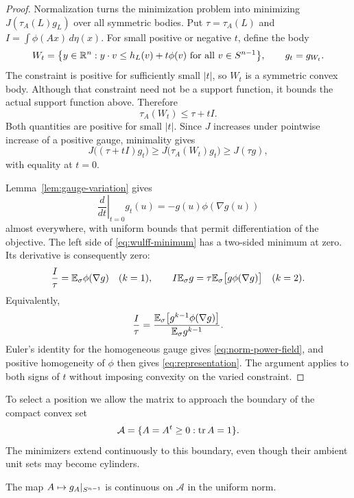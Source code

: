 \begin{proof}
Normalization turns the minimization problem into minimizing
$J(\tau_A(L)g_L)$ over all symmetric bodies. Put
$\tau=\tau_A(L)$ and $I=\int\phi(Ax)\,d\eta(x)$. For small
positive or negative $t$, define the body
\[
 W_t=\bigl\{y\in\mathbb R^n:
       y\cdot v\le h_L(v)+t\phi(v)\text{ for all }v\in S^{n-1}\bigr\},
 \qquad g_t=g_{W_t}.
\]
The constraint is positive for sufficiently small $|t|$, so $W_t$ is
a symmetric convex body. Although that constraint need not be a
support function, it bounds the actual support function above.
Therefore
\[
 \tau_A(W_t)\le\tau+tI.
\]
Both quantities are positive for small $|t|$. Since $J$ increases
under pointwise increase of a positive gauge, minimality gives
\begin{equation}\label{eq:wulff-minimum}
 J\bigl((\tau+tI)g_t\bigr)
 \ge J\bigl(\tau_A(W_t)g_t\bigr)
 \ge J(\tau g),
\end{equation}
with equality at $t=0$.

Lemma~\ref{lem:gauge-variation} gives
\[
 \left.\frac{d}{dt}\right|_{t=0}g_t(u)
 =-g(u)\phi(\nabla g(u))
\]
almost everywhere, with uniform bounds that permit differentiation
of the objective. The left side of \eqref{eq:wulff-minimum} has a
two-sided minimum at zero. Its derivative is consequently zero:
\[
 \frac{I}{\tau}=\mathbb E_{\sigma}\phi(\nabla g)\quad(k=1),
 \qquad
 I\mathbb E_{\sigma} g=\tau\mathbb E_{\sigma}\bigl[g\phi(\nabla g)\bigr]\quad(k=2).
\]
Equivalently,
\[
 \frac{I}{\tau}
 =\frac{\mathbb E_{\sigma}\bigl[g^{k-1}\phi(\nabla g)\bigr]}{\mathbb E_{\sigma} g^{k-1}}.
\]
Euler's identity for the homogeneous gauge gives
\eqref{eq:norm-power-field}, and positive homogeneity of $\phi$
then gives \eqref{eq:representation}. The argument applies to both
signs of $t$ without imposing convexity on the varied constraint.
\end{proof}

To select a position we allow the matrix to approach the boundary of
the compact convex set
\begin{equation}\label{eq:matrix-domain}
 \mathcal A=\{A=A^t\ge0:\operatorname{tr} A=1\}.
\end{equation}
The minimizers extend continuously to this boundary, even though
their ambient unit sets may become cylinders.

\begin{lemma}\label{lem:matrix-continuity}
The map $A\mapsto g_A|_{S^{n-1}}$ is continuous on $\mathcal A$ in
the uniform norm.
\end{lemma}

